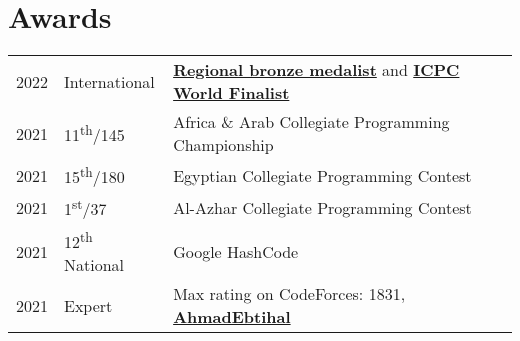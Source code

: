 \documentclass[]{deedy-resume-openfont}
\begin{document}
\begin{minipage}[t]{0.66\textwidth}
\section{Awards} 
\begin{tabular}{rll}
2022 & International & \href{https://www.linkedin.com/feed/update/urn:li:activity:6876965006358016000/}{\textbf{Regional bronze medalist}} and \href{https://icpc.global/ICPCID/D88WKIAMLAUS}{\textbf{ICPC World Finalist}}\\
2021 & 11\textsuperscript{th}/145 & Africa \& Arab Collegiate Programming Championship\\
2021 & 15\textsuperscript{th}/180 & Egyptian Collegiate Programming Contest\\
2021 & 1\textsuperscript{st}/37 & Al-Azhar Collegiate Programming Contest\\
2021 & 12\textsuperscript{th} National & Google HashCode \\
2021 & Expert & Max rating on CodeForces: 1831,  \href{https://codeforces.com/profile/AhmadEbtihal}{\textbf{AhmadEbtihal}}
\end{tabular}
\sectionsep


% 
% 

\end{minipage} 
\end{document}
